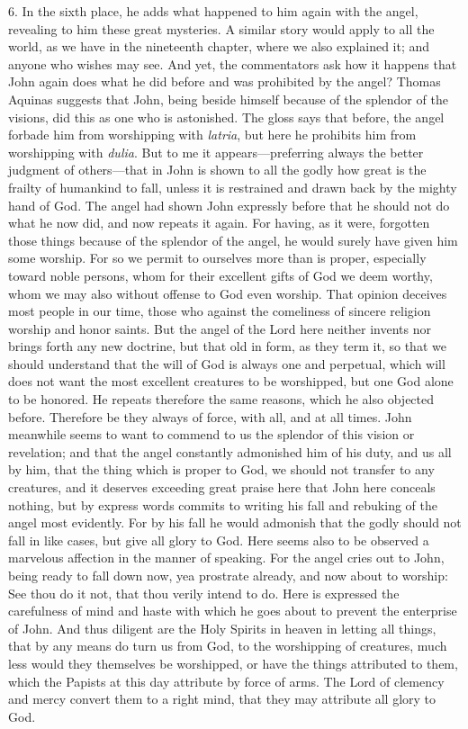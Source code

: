 6. In the sixth place, he adds what happened to him again with the angel, revealing to him these great mysteries. A similar story would apply to all the world, as we have in the nineteenth chapter, where we also explained it; and anyone who wishes may see. And yet, the commentators ask how it happens that John again does what he did before and was prohibited by the angel? Thomas Aquinas suggests that John, being beside himself because of the splendor of the visions, did this as one who is astonished. The gloss says that before, the angel forbade him from worshipping with \textit{latria}, but here he prohibits him from worshipping with \textit{dulia}. But to me it appears—preferring always the better judgment of others—that in John is shown to all the godly how great is the frailty of humankind to fall, unless it is restrained and drawn back by the mighty hand of God. The angel had shown John expressly before that he should not do what he now did, and now repeats it again. For having, as it were, forgotten those things because of the splendor of the angel, he would surely have given him some worship. For so we permit to ourselves more than is proper, especially toward noble persons, whom for their excellent gifts of God we deem worthy, whom we may also without offense to God even worship. That opinion deceives most people in our time, those who against the comeliness of sincere religion worship and honor saints. But the angel of the Lord here neither invents nor brings forth any new doctrine, but that old in form, as they term it, so that we should understand that the will of God is always one and perpetual, which will does not want the most excellent creatures to be worshipped, but one God alone to be honored. He repeats therefore the same reasons, which he also objected before. Therefore be they always of force, with all, and at all times. John meanwhile seems to want to commend to us the splendor of this vision or revelation; and that the angel constantly admonished him of his duty, and us all by him, that the thing which is proper to God, we should not transfer to any creatures, and it deserves exceeding great praise here that John here conceals nothing, but by express words commits to writing his fall and rebuking of the angel most evidently. For by his fall he would admonish that the godly should not fall in like cases, but give all glory to God. Here seems also to be observed a marvelous affection in the manner of speaking. For the angel cries out to John, being ready to fall down now, yea prostrate already, and now about to worship: See thou do it not, that thou verily intend to do. Here is expressed the carefulness of mind and haste with which he goes about to prevent the enterprise of John. And thus diligent are the Holy Spirits in heaven in letting all things, that by any means do turn us from God, to the worshipping of creatures, much less would they themselves be worshipped, or have the things attributed to them, which the Papists at this day attribute by force of arms. The Lord of clemency and mercy convert them to a right mind, that they may attribute all glory to God.
